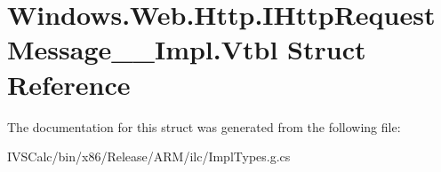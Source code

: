 \hypertarget{struct_windows_1_1_web_1_1_http_1_1_i_http_request_message_____impl_1_1_vtbl}{}\section{Windows.\+Web.\+Http.\+I\+Http\+Request\+Message\+\_\+\+\_\+\+Impl.\+Vtbl Struct Reference}
\label{struct_windows_1_1_web_1_1_http_1_1_i_http_request_message_____impl_1_1_vtbl}


The documentation for this struct was generated from the following file\+:\begin{DoxyCompactItemize}
\item 
I\+V\+S\+Calc/bin/x86/\+Release/\+A\+R\+M/ilc/Impl\+Types.\+g.\+cs\end{DoxyCompactItemize}
